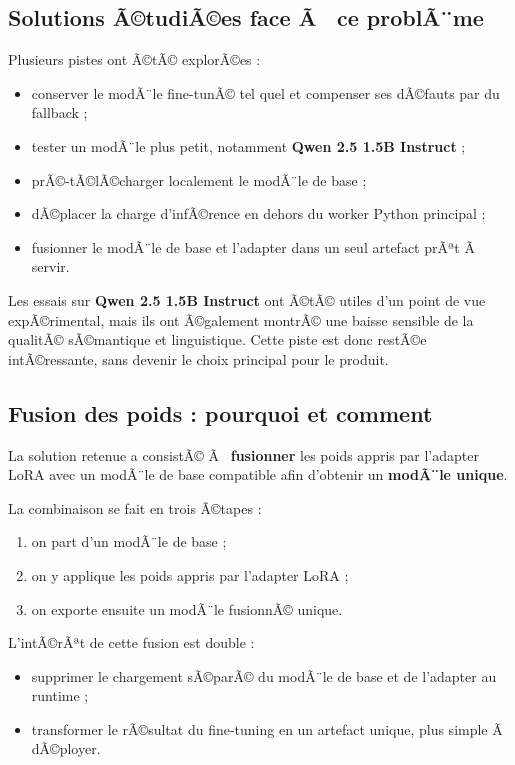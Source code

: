 ﻿\documentclass[12pt,a4paper]{article}
\begin{document}
\subsection{Solutions Ã©tudiÃ©es face Ã  ce problÃ¨me}
Plusieurs pistes ont Ã©tÃ© explorÃ©es :
\begin{itemize}
    \item conserver le modÃ¨le fine-tunÃ© tel quel et compenser ses dÃ©fauts par du fallback ;
    \item tester un modÃ¨le plus petit, notamment \textbf{Qwen 2.5 1.5B Instruct} ;
    \item prÃ©-tÃ©lÃ©charger localement le modÃ¨le de base ;
    \item dÃ©placer la charge d'infÃ©rence en dehors du worker Python principal ;
    \item fusionner le modÃ¨le de base et l'adapter dans un seul artefact prÃªt Ã  servir.
\end{itemize}

Les essais sur \textbf{Qwen 2.5 1.5B Instruct} ont Ã©tÃ© utiles d'un point de vue expÃ©rimental, mais ils ont Ã©galement montrÃ© une baisse sensible de la qualitÃ© sÃ©mantique et linguistique. Cette piste est donc restÃ©e intÃ©ressante, sans devenir le choix principal pour le produit.

\subsection{Fusion des poids : pourquoi et comment}
La solution retenue a consistÃ© Ã  \textbf{fusionner} les poids appris par l'adapter LoRA avec un modÃ¨le de base compatible afin d'obtenir un \textbf{modÃ¨le unique}.

La combinaison se fait en trois Ã©tapes :
\begin{enumerate}
    \item on part d'un modÃ¨le de base ;
    \item on y applique les poids appris par l'adapter LoRA ;
    \item on exporte ensuite un modÃ¨le fusionnÃ© unique.
\end{enumerate}

L'intÃ©rÃªt de cette fusion est double :
\begin{itemize}
    \item supprimer le chargement sÃ©parÃ© du modÃ¨le de base et de l'adapter au runtime ;
    \item transformer le rÃ©sultat du fine-tuning en un artefact unique, plus simple Ã  dÃ©ployer.
\end{itemize}
\end{document}
